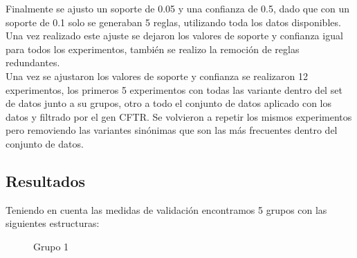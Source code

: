Finalmente se ajusto un soporte de 0.05 y una confianza de 0.5, dado que con un soporte de 0.1 solo se generaban 5 reglas, utilizando toda los datos disponibles. Una vez realizado este ajuste se dejaron los valores de soporte y confianza igual para todos los experimentos, también se realizo la remoción de reglas redundantes.\\

Una vez se ajustaron los valores de soporte y confianza se realizaron 12 experimentos, los primeros 5 experimentos con todas las variante dentro del set de datos junto a su grupos, otro a todo el conjunto de datos aplicado con los datos y filtrado por el gen CFTR. Se volvieron a repetir los mismos experimentos pero removiendo las variantes sinónimas que son las más frecuentes dentro del conjunto de datos.


\subsection{Resultados} 

Teniendo en cuenta las medidas de validación encontramos  5 grupos con las siguientes estructuras:

\begin{figure}[H]
	\centering
	\label{f:nube1}
	\caption{Grupo 1} \label{fig:grupo1}
\end{figure} 

